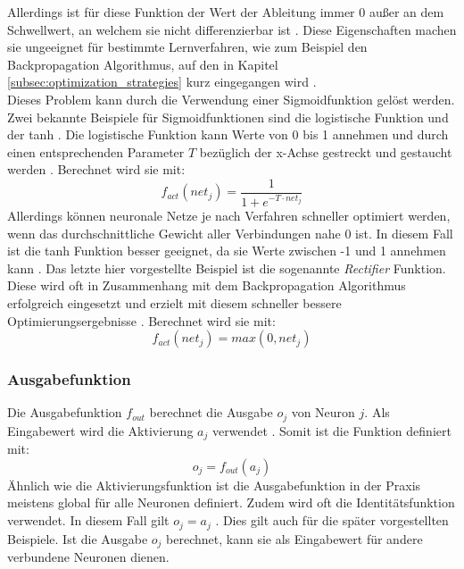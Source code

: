 Allerdings ist für diese Funktion der Wert der Ableitung immer $0$ außer an dem Schwellwert, an welchem sie nicht differenzierbar ist \cite{kriesel2008kleiner}. Diese Eigenschaften machen sie ungeeignet für bestimmte Lernverfahren, wie zum Beispiel den Backpropagation Algorithmus, auf den in Kapitel \ref{subsec:optimization_strategies} kurz eingegangen wird \cite{kriesel2008kleiner}. \\
Dieses Problem kann durch die Verwendung einer Sigmoidfunktion gelöst werden. Zwei bekannte Beispiele für Sigmoidfunktionen sind die logistische Funktion und der \ac{tanh} \cite{lecun2012efficient}. Die logistische Funktion kann Werte von 0 bis 1 annehmen und durch einen entsprechenden Parameter $T$ bezüglich der x-Achse gestreckt und gestaucht werden \cite{kriesel2008kleiner}. Berechnet wird sie mit:
$$f_{act}(net_j)=\frac{1}{1+e^{-T\cdot net_j}}$$
Allerdings können neuronale Netze je nach Verfahren schneller optimiert werden, wenn das durchschnittliche Gewicht aller Verbindungen nahe 0 ist. In diesem Fall ist die \ac{tanh} Funktion besser geeignet, da sie Werte zwischen -1 und 1 annehmen kann  \cite{lecun2012efficient}. Das letzte hier vorgestellte Beispiel ist die sogenannte \emph{Rectifier} Funktion. Diese wird oft in Zusammenhang mit dem Backpropagation Algorithmus erfolgreich eingesetzt und erzielt mit diesem schneller bessere Optimierungsergebnisse \cite{glorot2011deep}. Berechnet wird sie mit:
$$f_{act}(net_j)= max(0, net_j)$$

\subsubsection{Ausgabefunktion}
Die Ausgabefunktion $f_{out}$ berechnet die Ausgabe $o_j$ von Neuron $j$. Als Eingabewert wird die Aktivierung $a_j$ verwendet \cite{zell2003simulation}. Somit ist die Funktion definiert mit:
$$o_j = f_{out}(a_j)$$
Ähnlich wie die Aktivierungsfunktion ist die Ausgabefunktion in der Praxis meistens global für alle Neuronen definiert. Zudem wird oft die Identitätsfunktion verwendet. In diesem Fall gilt $o_j = a_j$ \cite{kriesel2008kleiner}. Dies gilt auch für die später vorgestellten Beispiele. Ist die Ausgabe $o_j$ berechnet, kann sie als Eingabewert für andere verbundene Neuronen dienen.

